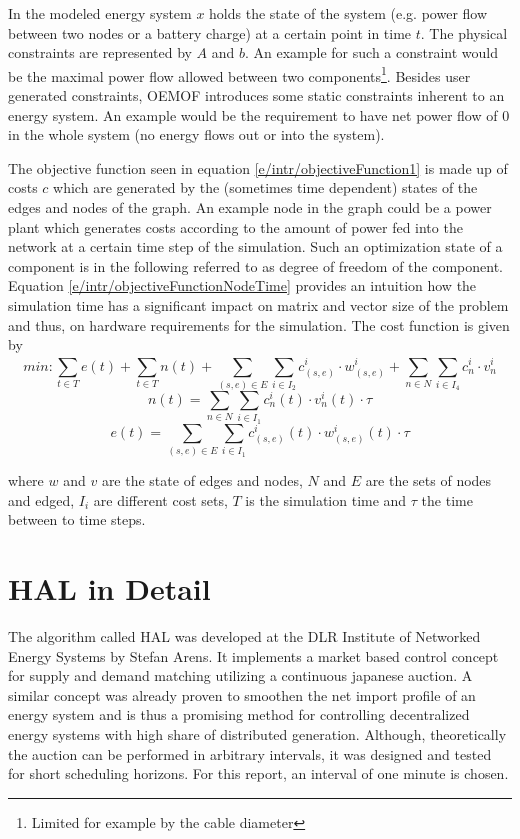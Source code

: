 \documentclass[a4paper,12pt]{book}
\theoremstyle{break}
\begin{document}
In the modeled energy system $x$ holds the state of the system (e.g. power flow between two nodes or a battery charge) at a certain point in time $t$. The physical constraints are represented by $A$ and $b$. An example for such a constraint would be the maximal power flow allowed between two components\footnote{Limited for example by the cable diameter}. Besides user generated constraints, \ac{OEMOF} introduces some static constraints inherent to an energy system. An example would be the requirement to have net power flow of 0 in the whole system (no energy flows out or into the system).

The objective function seen in equation \ref{e/intr/objectiveFunction1} is made up of costs $c$ which are generated by the (sometimes time dependent) states of the edges and nodes of the graph. An example node in the graph could be a power plant which generates costs according to the amount of power fed into the network at a certain time step of the simulation. Such an optimization state of a component is in the following referred to as degree of freedom of the component.
Equation \ref{e/intr/objectiveFunctionNodeTime} provides an intuition how the simulation time has a significant impact on matrix and vector size of the problem and thus, on hardware requirements for the simulation.
The cost function is given by
\begin{equation}\label{e/intr/objectiveFunction1}
	min: \sum_{t\in T}e(t)+\sum_{t\in T}^{}n(t) 
	+ \sum_{(s,e)\in E}\sum_{i\in I_2}c^i_{(s,e)}\cdot w^i_{(s,e)}
	+ \sum_{n\in N}\sum_{i\in I_4}c^i_{n}\cdot v^i_{n}
\end{equation}
\begin{equation}\label{e/intr/objectiveFunctionNodeTime}
n(t)=\sum_{n\in N}\sum_{i\in I_1}c^i_n(t)\cdot v^i_n(t)\cdot \tau
\end{equation}
\begin{equation}\label{e/intr/objectiveFunctionEdgeTime}
e(t)=\sum_{(s,e)\in E}\sum_{i\in I_1}c^i_{(s,e)}(t)\cdot w^i_{(s,e)}(t)\cdot \tau
\end{equation}

where $w$ and $v$ are the state of edges and nodes, $N$ and $E$ are the sets of nodes and edged, $I_i$ are different cost sets, $T$ is the simulation time and $\tau$ the time between to time steps.

\section{HAL in Detail}\label{s/intr/hal}
The algorithm called HAL was developed at the \ac{DLR} Institute of Networked Energy Systems by Stefan Arens.
It implements a market based control concept for supply and demand matching utilizing a continuous japanese auction. 
A similar concept was already proven to smoothen the net import profile of an energy system and is thus a promising method for controlling decentralized energy systems with high share of distributed generation\cite{powermatcher}. Although, theoretically the auction can be performed in arbitrary intervals, it was designed and tested for short scheduling horizons. For this report, an interval of one minute is chosen.
\end{document}
